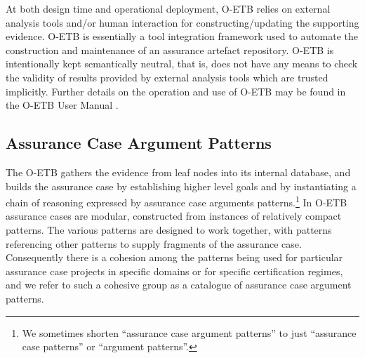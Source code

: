 \documentclass[12pt,twoside,a4paper]{article}
\begin{document}
At both design time and
operational deployment, O-ETB relies on external analysis tools and/or human interaction
for constructing/updating the supporting evidence.  O-ETB is essentially a
tool integration framework used to automate the construction and
maintenance of an assurance artefact repository.  O-ETB is
intentionally kept semantically neutral, that is, does not have any means
to check the validity of results provided by external analysis tools which are trusted implicitly.
Further details on the operation and use of O-ETB may be found in the O-ETB User Manual \cite{O-ETB-User-Manual}.

\subsection{Assurance Case Argument Patterns}
The O-ETB gathers the evidence from leaf nodes into its internal database, and builds the assurance case by establishing higher level goals and by instantiating a chain of reasoning expressed by assurance case arguments patterns.\footnote{We sometimes shorten ``assurance case argument patterns'' to just ``assurance case patterns'' or ``argument patterns''.}
In O-ETB assurance cases are modular, constructed from instances of relatively compact patterns.
The various patterns are designed to work together, with patterns referencing other patterns to supply fragments of the assurance case.
Consequently there is a cohesion among the patterns being used for particular assurance case projects in specific domains or for specific certification regimes, and we refer to such a cohesive group as a catalogue of assurance case argument patterns.
\end{document}
